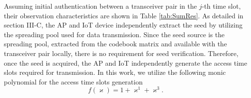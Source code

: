 \documentclass[journal,10pt]{IEEEtran}
\begin{document}
Assuming initial authentication between a transceiver pair in the $j$-th time slot, their observation characteristics are shown in Table \ref{tab:SumRes}. As detailed in section III-C, the AP and IoT device independently extract the seed by utilizing the spreading pool used for data transmission. Since the seed source is the spreading pool, extracted from the codebook matrix and available with the transceiver pair locally, there is no requirement for seed verification. Therefore, once the seed is acquired, the AP and IoT independently generate the access time slots required for transmission. In this work, we utilize the following monic polynomial for the access time slots generation
\begin{equation}
    f(\varkappa) = 1 + \varkappa^1 + \varkappa^3. 
\end{equation}
\end{document}
